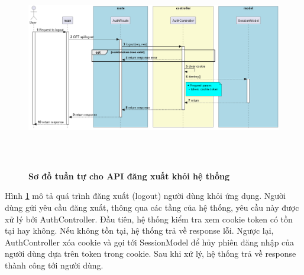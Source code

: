 \begin{enumerate}[a)]
\begin{figure}[H]
  \centering
  \includegraphics[width=16cm,height=9cm]{Images/server/sequence/server/logout.png}
  \caption[Sơ đồ tuần tự cho API đăng xuất khỏi hệ thống ]{\bfseries \fontsize{12pt}{0pt}
  \selectfont Sơ đồ tuần tự cho API đăng xuất khỏi hệ thống }
  \label{backend_logout} %
\end{figure}
Hình \ref{backend_logout} mô tả quá trình đăng xuất (logout) người dùng khỏi ứng dụng. Người dùng gửi yêu cầu đăng xuất, thông qua các tầng của hệ thống, yêu cầu này được xử lý bởi AuthController. Đầu tiên, hệ thống kiểm tra xem cookie token có tồn tại hay không. Nếu không tồn tại, hệ thống trả về response lỗi. Ngược lại, AuthController xóa cookie và gọi tới SessionModel để hủy phiên đăng nhập của người dùng dựa trên token trong cookie. Sau khi xử lý, hệ thống trả về response thành công tới người dùng.


\end{enumerate}
